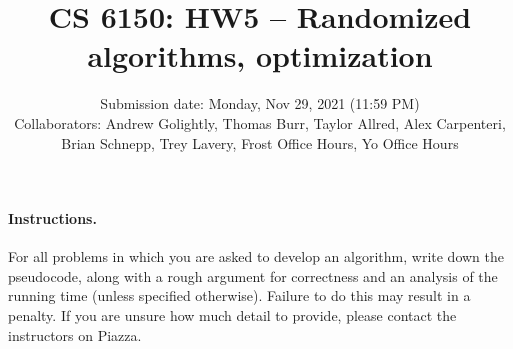 \documentclass[addpoints, 11pt]{exam}
\title{CS 6150: HW5 -- Randomized algorithms, optimization}
\date{Submission date: Monday, Nov 29, 2021 (11:59 PM) \\ 
Collaborators: Andrew Golightly, Thomas Burr, Taylor Allred, Alex Carpenteri, Brian Schnepp, Trey Lavery, Frost Office Hours, Yo Office Hours}
\begin{document}
\maketitle
\begin{center}
\end{center}

\pointname{}
\bonuspointname{}
\pointformat{[\bfseries\thepoints]}

\begin{center}
  \gradetable
\end{center}
\newpage
\paragraph{Instructions.}  For all problems in which you are asked to develop an algorithm, write down the pseudocode, along with a rough argument for correctness and an analysis of the running time (unless specified otherwise). Failure to do this may result in a penalty. If you are unsure how much detail to provide, please contact the instructors on Piazza.
\end{document}
